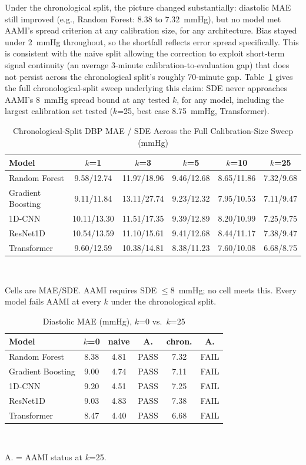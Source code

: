 \documentclass[journal]{IEEEtran}
\begin{document}
Under the chronological split, the picture changed substantially: diastolic MAE still improved (e.g., Random Forest: 8.38 to 7.32~mmHg), but no model met AAMI's spread criterion at any calibration size, for any architecture. Bias stayed under 2~mmHg throughout, so the shortfall reflects error spread specifically. This is consistent with the naive split allowing the correction to exploit short-term signal continuity (an average 3-minute calibration-to-evaluation gap) that does not persist across the chronological split's roughly 70-minute gap. Table~\ref{tab:chron-sweep} gives the full chronological-split sweep underlying this claim: SDE never approaches AAMI's 8~mmHg spread bound at any tested $k$, for any model, including the largest calibration set tested ($k$=25, best case 8.75~mmHg, Transformer).

\begin{table}[!t]
\caption{Chronological-Split DBP MAE / SDE Across the Full Calibration-Size Sweep (mmHg)}
\label{tab:chron-sweep}
\centering
\begin{tabular}{lccccc}
\toprule
Model & $k$=1 & $k$=3 & $k$=5 & $k$=10 & $k$=25 \\
\midrule
Random Forest & 9.58/12.74 & 11.97/18.96 & 9.46/12.68 & 8.65/11.86 & 7.32/9.68 \\
Gradient Boosting & 9.11/11.84 & 13.11/27.74 & 9.23/12.32 & 7.95/10.53 & 7.11/9.47 \\
1D-CNN & 10.11/13.30 & 11.51/17.35 & 9.39/12.89 & 8.20/10.99 & 7.25/9.75 \\
ResNet1D & 10.54/13.59 & 11.10/15.61 & 9.41/12.68 & 8.44/11.17 & 7.38/9.47 \\
Transformer & 9.60/12.59 & 10.38/14.81 & 8.38/11.23 & 7.60/10.08 & 6.68/8.75 \\
\bottomrule
\end{tabular}
\\[2pt]
\raggedright\footnotesize Cells are MAE/SDE. AAMI requires SDE $\le 8$~mmHg; no cell meets this. Every model fails AAMI at every $k$ under the chronological split.
\end{table}

\begin{table}[!t]
\caption{Diastolic MAE (mmHg), $k$=0 vs.\ $k$=25}
\label{tab:pers}
\centering
\footnotesize
\begin{tabular}{lccccc}
\toprule
Model & $k$=0 & naive & A. & chron. & A. \\
\midrule
Random Forest & 8.38 & 4.81 & PASS & 7.32 & FAIL \\
Gradient Boosting & 9.00 & 4.74 & PASS & 7.11 & FAIL \\
1D-CNN & 9.20 & 4.51 & PASS & 7.25 & FAIL \\
ResNet1D & 9.03 & 4.83 & PASS & 7.38 & FAIL \\
Transformer & 8.47 & 4.40 & PASS & 6.68 & FAIL \\
\bottomrule
\end{tabular}
\\[2pt]
\raggedright\footnotesize A. = AAMI status at $k$=25.
\end{table}
\end{document}

